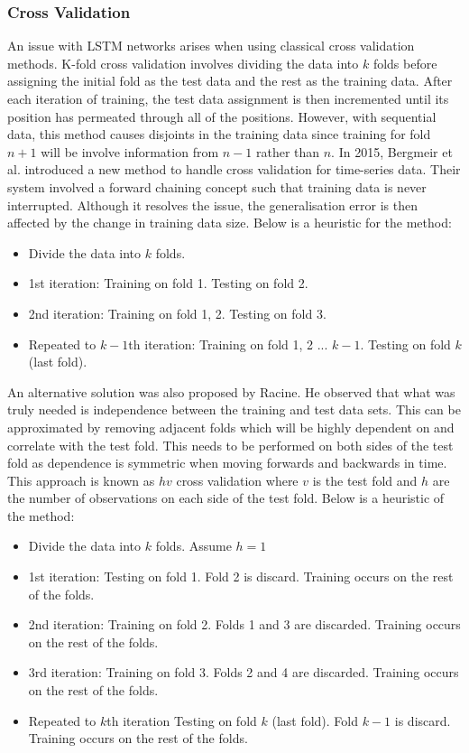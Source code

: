 \documentclass[10pt,onecolumn,letterpaper]{article}
\begin{document}
\subsubsection{Cross Validation} \label{cross validation}

An issue with LSTM networks arises when using classical cross validation methods. K-fold cross validation involves dividing the data into $k$ folds before assigning the initial fold as the test data and the rest as the training data. After each iteration of training, the test data assignment is then incremented until its position has permeated through all of the positions. However, with sequential data, this method causes disjoints in the training data since training for fold $n+1$ will be involve information from $n-1$ rather than $n$. In 2015, Bergmeir et al. introduced a new method\cite{Bergmeir} to handle cross validation for time-series data. Their system involved a forward chaining concept such that training data is never interrupted. Although it resolves the issue, the generalisation error is then affected by the change in training data size. Below is a heuristic for the method: 

\begin{itemize}
 	\item Divide the data into $k$ folds. 
	\item 1st iteration: Training on fold 1. Testing on fold 2.
	\item 2nd iteration: Training on fold 1, 2. Testing on fold 3. 
	\item Repeated to $k-1$th iteration: Training on fold 1, 2 ... $k-1$. Testing on fold $k$ (last fold). 
\end{itemize}

An alternative solution\cite{Racine} was also proposed by Racine. He observed that what was truly needed is independence between the training and test data sets. This can be approximated by removing adjacent folds which will be highly dependent on and correlate with the test fold. This needs to be performed on both sides of the test fold as dependence is symmetric when moving forwards and backwards in time. This approach is known as $hv$ cross validation where $v$ is the test fold and $h$ are the number of observations on each side of the test fold. Below is a heuristic of the method:

\begin{itemize}
 	\item Divide the data into $k$ folds. Assume $h = 1$ 
	\item 1st iteration: Testing on fold 1. Fold 2 is discard. Training occurs on the rest of the folds. 
	\item 2nd iteration: Training on fold 2.  Folds 1 and 3 are discarded. Training occurs on the rest of the folds. 
	\item 3rd iteration: Training on fold 3.  Folds 2 and 4 are discarded. Training occurs on the rest of the folds. 
	\item Repeated to $k$th iteration Testing on fold $k$ (last fold). Fold $k-1$ is discard. Training occurs on the rest of the folds. 
\end{itemize}
\end{document}
